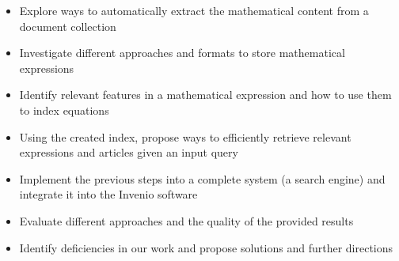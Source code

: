 \begin{itemize}
\item Explore ways to automatically extract the mathematical content from a document collection
\item Investigate different approaches and formats to store mathematical expressions
\item Identify relevant features in a mathematical expression and how to use them to index equations
\item Using the created index, propose ways to efficiently retrieve relevant expressions and articles given an input query
\item Implement the previous steps into a complete system (a search engine) and integrate it into the Invenio software
\item Evaluate different approaches and the quality of the provided results
\item Identify deficiencies in our work and propose solutions and further directions
\end{itemize}


















